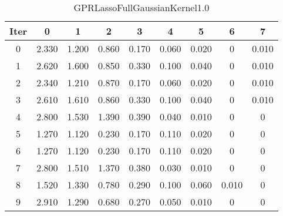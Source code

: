 \begin{table}
	\begin{center}
		\begin{tabular}{|c|c|c|c|c|c|c|c|c|}
			\hline
			Iter & 0 & 1 & 2 & 3 & 4 & 5 & 6 & 7 \\
			\hline
			0 & 2.330 & 1.200 & 0.860 & 0.170 & 0.060 & 0.020 & 0 & 0.010 \\
			\hline
			1 & 2.620 & 1.600 & 0.850 & 0.330 & 0.100 & 0.040 & 0 & 0.010 \\
			\hline
			2 & 2.340 & 1.210 & 0.870 & 0.170 & 0.060 & 0.020 & 0 & 0.010 \\
			\hline
			3 & 2.610 & 1.610 & 0.860 & 0.330 & 0.100 & 0.040 & 0 & 0.010 \\
			\hline
			4 & 2.800 & 1.530 & 1.390 & 0.390 & 0.040 & 0.010 & 0 & 0 \\
			\hline
			5 & 1.270 & 1.120 & 0.230 & 0.170 & 0.110 & 0.020 & 0 & 0 \\
			\hline
			6 & 1.270 & 1.120 & 0.230 & 0.170 & 0.110 & 0.020 & 0 & 0 \\
			\hline
			7 & 2.800 & 1.510 & 1.370 & 0.380 & 0.030 & 0.010 & 0 & 0 \\
			\hline
			8 & 1.520 & 1.330 & 0.780 & 0.290 & 0.100 & 0.060 & 0.010 & 0 \\
			\hline
			9 & 2.910 & 1.290 & 0.680 & 0.270 & 0.050 & 0.010 & 0 & 0 \\
			\hline
		\end{tabular}
	\end{center}
	\caption{GPRLassoFullGaussianKernel1.0}
\end{table}